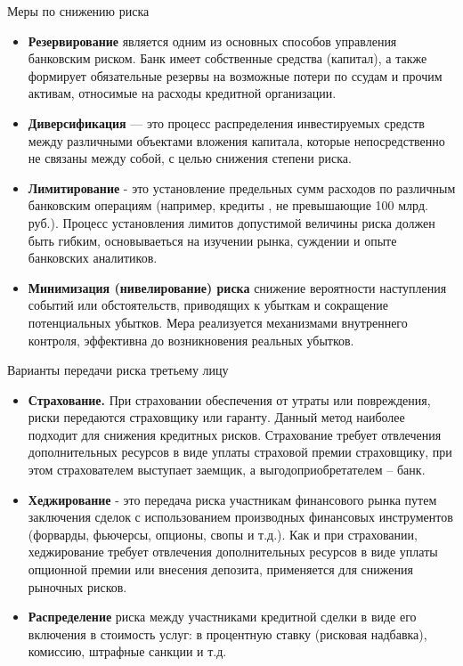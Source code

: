 \documentclass[financial_risks_lectures.tex]{subfiles}
\begin{document}
\begin{frame}[ allowframebreaks ]{Меры по снижению риска}
\begin{itemize}
\item
\textbf{Резервирование }является одним из основных способов управления банковским риском. Банк имеет собственные средства (капитал), а также формирует обязательные резервы на возможные потери по ссудам и прочим активам, относимые на расходы кредитной организации.
\item
\textbf{Диверсификация }— это процесс распределения инвестируемых средств между различными объектами вложения капитала, которые непосредственно не связаны между собой, с целью снижения степени риска. 
\item
\textbf{Лимитирование }- это установление предельных сумм расходов по различным банковским операциям (например, кредиты , не превышающие 100 млрд. руб.). Процесс установления лимитов допустимой величины риска должен быть гибким, основываеться на изучении рынка, суждении и опыте банковских аналитиков.
\item
\textbf{Минимизация (нивелирование) риска} снижение вероятности наступления событий или обстоятельств, приводящих к убыткам и сокращение потенциальных убытков. Мера реализуется механизмами внутреннего контроля, эффективна до возникновения реальных убытков.
\end{itemize}
\end{frame}

\begin{frame}[ allowframebreaks ]{Варианты передачи риска третьему лицу}
\begin{itemize}
\item
\textbf{Страхование. }При страховании обеспечения от утраты или повреждения, риски передаются страховщику или гаранту. Данный метод наиболее подходит для снижения кредитных рисков. Страхование требует отвлечения дополнительных ресурсов в виде уплаты страховой премии страховщику, при этом страхователем выступает заемщик, а выгодоприобретателем – банк.
\item
\textbf{Хеджирование} - это передача риска участникам финансового рынка путем заключения сделок с использованием производных финансовых инструментов (форварды, фьючерсы, опционы, свопы и т.д.). Как и при страховании, хеджирование требует отвлечения дополнительных ресурсов в виде уплаты опционной премии или внесения депозита, применяется для снижения рыночных рисков.

\item
\textbf{Распределение } риска между участниками кредитной сделки в виде его включения в стоимость услуг: в процентную ставку (рисковая надбавка), комиссию, штрафные санкции и т.д. 
\end{itemize}
\end{frame}
\end{document}
